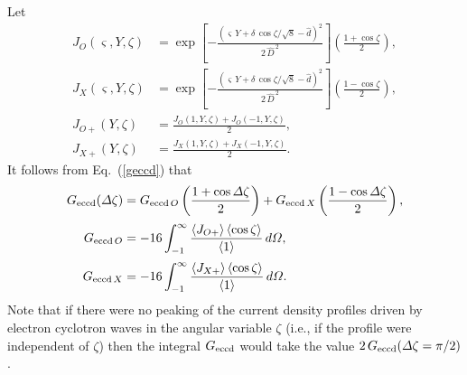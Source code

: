 \documentclass{iopjournal}
\begin{document}
{Let 
\begin{align}
J_O(\varsigma,Y,\zeta) &=  \exp\!\left[-\frac{(\varsigma\,Y+\delta\,\cos\zeta/\sqrt{8}-\hat{d})^2}{2\,\hat{D}^{\,2}}\right]\left(\frac{1+\cos\zeta}{2}\right),\\[0.5ex]
J_X(\varsigma,Y,\zeta) &=  \exp\!\left[-\frac{(\varsigma\,Y+\delta\,\cos\zeta/\sqrt{8}-\hat{d})^2}{2\,\hat{D}^{\,2}}\right]\left(\frac{1-\cos\zeta}{2}\right),\\[0.5ex]
J_{O+}(Y,\zeta) &= \frac{J_O(1,Y,\zeta) + J_O(-1,Y,\zeta)}{2},\\[0.5ex]
J_{X+}(Y,\zeta) &= \frac{J_X(1,Y,\zeta) + J_X(-1,Y,\zeta)}{2}.
\end{align}
It follows from Eq.~(\ref{geccd}) that
\begin{align}
G_{\rm eccd}({\mit\Delta}\zeta)& = G_{{\rm eccd}\,O}\left(\frac{1+\cos{\mit\Delta}\zeta}{2}\right)+G_{{\rm eccd}\,X}\left(\frac{1-\cos{\mit\Delta}\zeta}{2}\right),\\[0.5ex]
G_{{\rm eccd}\,O} &= - 16\int_{-1}^\infty \frac{\langle J_{O+}\rangle\,\langle \cos\zeta\rangle}{\langle 1\rangle}\,d{\mit\Omega},\\[0.5ex]
G_{{\rm eccd}\,X} &= - 16\int_{-1}^\infty \frac{\langle J_{X+}\rangle\,\langle \cos\zeta\rangle}{\langle 1\rangle}\,d{\mit\Omega}.
\end{align}
Note that if there were no peaking of the current density profiles driven by electron cyclotron waves in the angular variable $\zeta$ (i.e., if the profile were
independent of $\zeta$) then the integral $G_{\rm eccd}$ would take the value  $2\,G_{\rm eccd}({\mit\Delta}\zeta= \pi/2)$.

}
\end{document}
